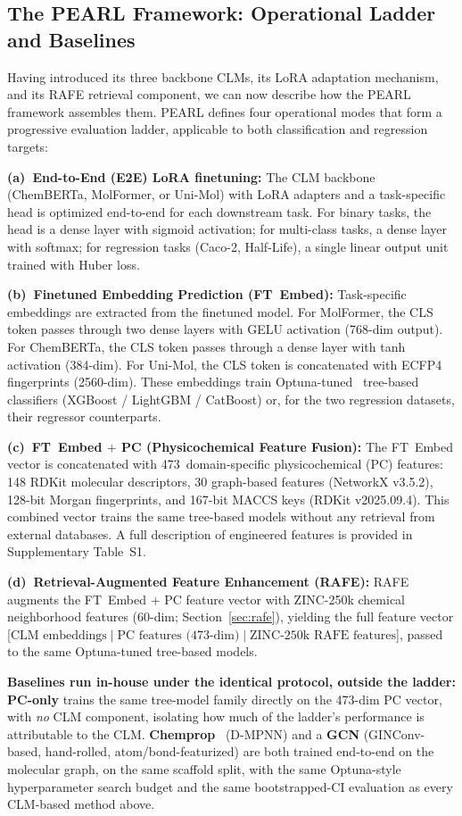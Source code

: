 \documentclass[pdflatex,sn-basic]{sn-jnl}%
\begin{document}
\subsection{The PEARL Framework: Operational Ladder and Baselines}\label{sec:pearl_ladder}
Having introduced its three backbone CLMs, its LoRA adaptation mechanism, and its RAFE retrieval component, we can now describe how the PEARL framework assembles them. PEARL defines four operational modes that form a progressive evaluation ladder, applicable to both classification and regression targets:

\textbf{(a)~End-to-End (E2E) LoRA finetuning:} The CLM backbone (ChemBERTa, MolFormer, or Uni-Mol) with LoRA adapters and a task-specific head is optimized end-to-end for each downstream task. For binary tasks, the head is a dense layer with sigmoid activation; for multi-class tasks, a dense layer with softmax; for regression tasks (Caco-2, Half-Life), a single linear output unit trained with Huber loss.

\textbf{(b)~Finetuned Embedding Prediction (FT~Embed):} Task-specific embeddings are extracted from the finetuned model. For MolFormer, the CLS token passes through two dense layers with GELU activation (768-dim output). For ChemBERTa, the CLS token passes through a dense layer with tanh activation (384-dim). For Uni-Mol, the CLS token is concatenated with ECFP4 fingerprints (2560-dim). These embeddings train Optuna-tuned~\cite{akiba2019optuna} tree-based classifiers (XGBoost / LightGBM / CatBoost) or, for the two regression datasets, their regressor counterparts.

\textbf{(c)~FT~Embed $+$ PC (Physicochemical Feature Fusion):} The FT~Embed vector is concatenated with 473~domain-specific physicochemical (PC) features: 148 RDKit molecular descriptors, 30 graph-based features (NetworkX v3.5.2), 128-bit Morgan fingerprints, and 167-bit MACCS keys (RDKit v2025.09.4). This combined vector trains the same tree-based models without any retrieval from external databases. A full description of engineered features is provided in Supplementary Table~S1.

\textbf{(d)~Retrieval-Augmented Feature Enhancement (RAFE):} RAFE augments the FT~Embed $+$ PC feature vector with ZINC-250k chemical neighborhood features (60-dim; Section~\ref{sec:rafe}), yielding the full feature vector [$\text{CLM embeddings} \mid \text{PC features (473-dim)} \mid \text{ZINC-250k RAFE features}$], passed to the same Optuna-tuned tree-based models.

\textbf{Baselines run in-house under the identical protocol, outside the ladder:} \textbf{PC-only} trains the same tree-model family directly on the 473-dim PC vector, with \emph{no} CLM component, isolating how much of the ladder's performance is attributable to the CLM. \textbf{Chemprop}~\cite{yang2019chemprop} (D-MPNN) and a \textbf{GCN} (GINConv-based, hand-rolled, atom/bond-featurized) are both trained end-to-end on the molecular graph, on the same scaffold split, with the same Optuna-style hyperparameter search budget and the same bootstrapped-CI evaluation as every CLM-based method above.
\end{document}
